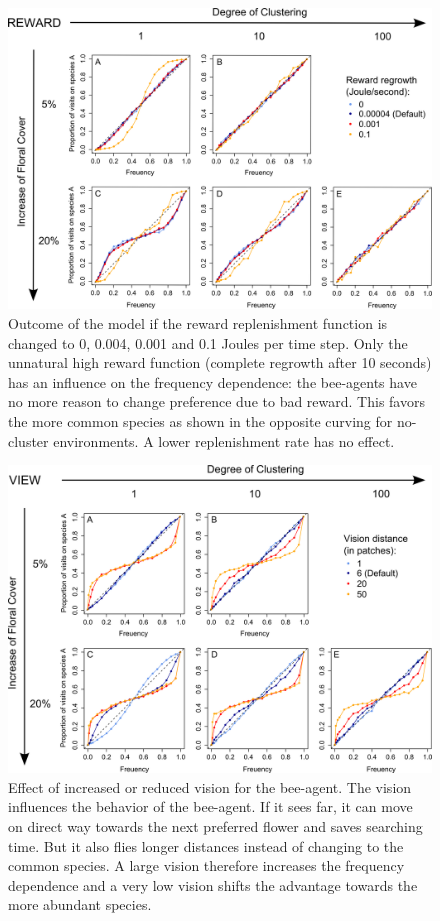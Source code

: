 \begin{figure} [!h] %
	\centering
	\includegraphics[width=14cm]{Images/SA_reward}
	\caption{Outcome of the model if the reward replenishment function is changed to 0, 0.004, 0.001 and 0.1 Joules per time step. Only the unnatural high reward function (complete regrowth after 10 seconds) has an influence on the frequency dependence: the bee-agents have no more reason to change preference due to bad reward. This favors the more common species as shown in the opposite curving for no-cluster environments. A lower replenishment rate has no effect.} 
	\label{fig:SA_reward}
\end{figure}

\clearpage


\begin{figure} [!h]
	\centering
	\includegraphics[width=14cm]{Images/SA_view}
	\caption{Effect of increased or reduced vision for the bee-agent. The vision influences the behavior of the bee-agent. If it sees far, it can move on direct way towards the next preferred flower and saves searching time. But it also flies longer distances instead of changing to the common species. A large vision therefore increases the frequency dependence and a very low vision shifts the advantage towards the more abundant species.}
	\label{fig:SA_view}
\end{figure}

